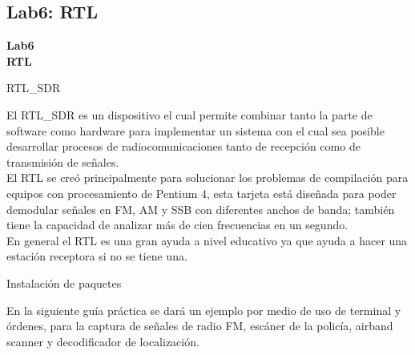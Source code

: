 \subsection{Lab6: RTL}
\begin{frame}{}


\bfseries{\textrm{\LARGE Lab6\\ \Large RTL}}
\raggedright
\end{frame}

\begin{frame}{RTL\_SDR}



El RTL\_SDR es un dispositivo el cual permite combinar tanto la parte de software como hardware para implementar un sistema con el cual sea posible desarrollar procesos de radiocomunicaciones tanto de recepción como de transmisión de señales.\\ \vspace{2mm}
El RTL se creó principalmente para solucionar los problemas de compilación para equipos con procesamiento de Pentium 4, esta tarjeta está diseñada para poder demodular señales en FM, AM y SSB con diferentes anchos de banda; también tiene la capacidad de analizar más de cien frecuencias en un segundo.\\\vspace{2mm}
En general el RTL es una gran ayuda a nivel educativo ya que ayuda a hacer una estación receptora si no se tiene una.


\end{frame}
\begin{frame}{Instalación de paquetes}

En la siguiente guía práctica se dará un ejemplo por medio de uso de terminal y órdenes, para la captura de señales de radio FM, escáner de la policía, airband scanner y decodificador de localización.

\end{frame}


